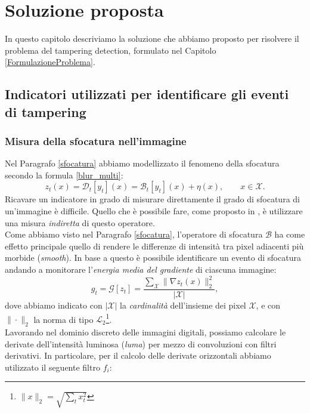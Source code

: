 \chapter{Soluzione proposta}
\label{SoluzioneProposta}
\thispagestyle{empty}

\vspace{0.5cm}

\noindent In questo capitolo descriviamo la soluzione che abbiamo proposto per risolvere il problema del tampering detection, formulato nel Capitolo \ref{FormulazioneProblema}.
\section{Indicatori utilizzati per identificare gli eventi di tampering}
\label{indicatori}
\subsection{Misura della sfocatura nell'immagine}
Nel Paragrafo \ref{sfocatura} abbiamo modellizzato il fenomeno della sfocatura secondo la formula \eqref{blur_multi}:
\[z_t(x)=\mathcal{D}_t[y_t](x) = \mathcal{B}_t[y_t](x) + \eta(x), \qquad x \in \mathcal{X}.\]
Ricavare un indicatore in grado di misurare direttamente il grado di sfocatura di un'immagine \`e difficile.
Quello che \`e possibile fare, come proposto in \cite{alippi2010detecting}, \`e utilizzare una misura \textit{indiretta} di questo operatore.\\
Come abbiamo visto nel Paragrafo \ref{sfocatura}, l'operatore di sfocatura $\mathcal{B}$ ha come effetto principale quello di rendere le differenze di intensit\`a tra pixel adiacenti pi\`u morbide (\textit{smooth}).
In base a questo \`e possibile identificare un evento di sfocatura andando a monitorare l'\textit{energia media del gradiente} di ciascuna immagine:
\begin{equation}
\label{eq:energyGradient}
g_t = \mathcal{G}[z_t] =\frac{\sum_{\mathcal{X}}\| \nabla z_t(x) \| _2^2 }{|\mathcal{X}|} ,
\end{equation}  
dove abbiamo indicato con $|\mathcal{X}|$ la \textit{cardinalit\`a} dell'insieme dei pixel $\mathcal{X}$, e con $\|\cdot\|_2$ la norma di tipo $\mathcal{L}_2$\footnote{$\|x\|_2=\sqrt{\sum_{t}x_t^2}$}.\\
Lavorando nel dominio discreto delle immagini digitali, possiamo calcolare le derivate dell'intensit\`a luminosa (\textit{luma}) per mezzo di convoluzioni con filtri derivativi.
In particolare, per il calcolo delle derivate orizzontali  abbiamo utilizzato il seguente filtro $f_i$:

